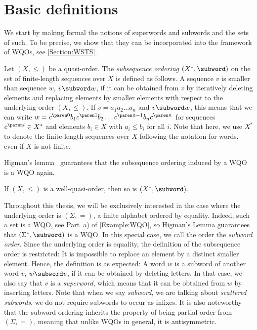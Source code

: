 \documentclass[../../diss.tex]{subfiles}
\begin{document}
\section{Basic definitions}%
\label{Closures:Defs}%

We start by making formal the notions of superwords and subwords and the sets of such.
To be precise, we show that they can be incorporated into the framework of WQOs, see \cref{Section:WSTS}.

Let $(X,\leq)$ be a quasi-order.
The \emph{subsequence ordering} $(X^*,\subword)$ on the set of finite-length sequences over $X$ is defined as follows.
A sequence $v$ is smaller than sequence $w$, $v \subword w$, if it can be obtained from $v$ by iteratively deleting elements and replacing elements by smaller elements with respect to the underlying order $(X,\leq)$.
If $v = a_1 a_2 \ldots a_n$ and $v \subword w$, this means that we can write
$w = \itr{c}{0} b_1 \itr{c}{1} b_2 \ldots \itr{c}{n-1} b_n \itr{c}{n}$ for sequences $\itr{c}{i} \in X^*$ and elements $b_i \in X$ with $a_i \leq b_i$ for all $i$.
Note that here, we use $X^*$ to denote the finite-length sequences over $X$ following the notation for words, even if $X$ is not finite.

Higman's lemma~\cite{Higman52} guarantees that the subsequence ordering induced by a WQO is a WQO again.

\begin{lemma}%
\label{Lemma:Higman}%
    If $(X,\leq)$ is a well-quasi-order, then so is $(X^*,\subword)$.
\end{lemma}

Throughout this thesis, we will be exclusively interested in the case where the underlying order is $(\Sigma,=)$, a finite alphabet ordered by equality.
Indeed, such a set is a WQO, see Part~a) of \cref{Example:WQO}, so Higman's Lemma guarantees that $(\Sigma^*,\subword)$ is a WQO.\@
In this special case, we call the order the \emph{subword order}.
Since the underlying order is equality, the definition of the subsequence order is restricted: It is impossible to replace an element by a distinct smaller element.
Hence, the definition is as expected: A word $w$ is a subword of another word $v$, $w \subword v$, if it can be obtained by deleting letters.
In that case, we also say that $v$ is a \emph{superword}, which means that it can be obtained from $w$ by inserting letters.
Note that when we say \emph{subword}, we are talking about \emph{scattered subwords}, \ie we do not require subwords to occur as infixes.
It is also noteworthy that the subword ordering inherits the property of being partial order from $(\Sigma,=)$, meaning that unlike WQOs in general, it is antisymmetric.
\end{document}
